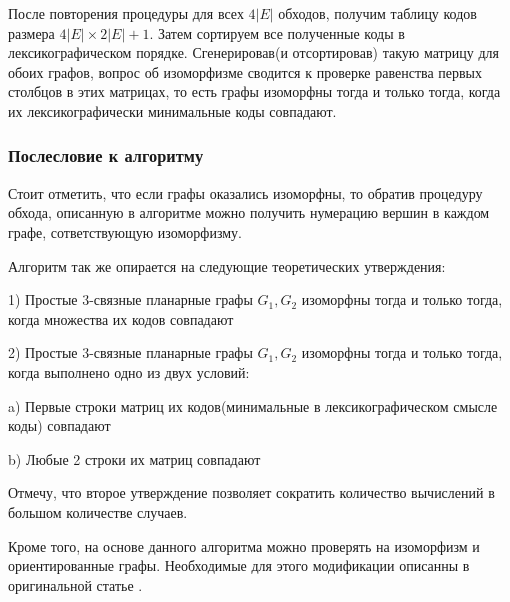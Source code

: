 После повторения процедуры для всех $4|E|$ обходов, получим таблицу кодов размера $4|E| \times 2|E| + 1$. Затем сортируем все полученные коды в лексикографическом порядке. Сгенерировав(и отсортировав) такую матрицу для обоих графов, вопрос об изоморфизме сводится к проверке равенства первых столбцов в этих матрицах, то есть графы изоморфны тогда и только тогда, когда их лексикографически минимальные коды совпадают.

\subsubsection*{Послесловие к алгоритму}
Стоит отметить, что если графы оказались изоморфны, то обратив процедуру обхода, описанную в алгоритме можно получить нумерацию вершин в каждом графе, сответствующую изоморфизму. 

Алгоритм так же опирается на следующие теоретических утверждения:

1) Простые 3-связные планарные графы $G_1, G_2$ изоморфны тогда и только тогда, когда множества их кодов совпадают

2) Простые 3-связные планарные графы $G_1, G_2$ изоморфны тогда и только тогда, когда выполнено одно из двух условий:
        
        \quad a) Первые строки матриц их кодов(минимальные в лексикографическом смысле коды) совпадают

        \quad b) Любые 2 строки их матриц совпадают

Отмечу, что второе утверждение позволяет сократить количество вычислений в большом количестве случаев.

Кроме того, на основе данного алгоритма можно проверять на изоморфизм и ориентированные графы. Необходимые для этого модификации описанны в оригинальной статье \cite{3}.
